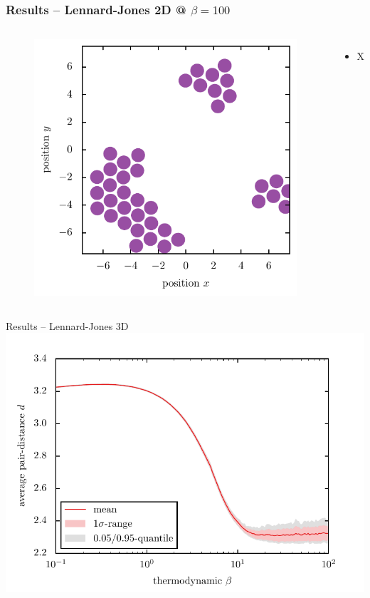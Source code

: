 \documentclass[mathserif,serif]{beamer}
\begin{document}
\begin{frame}
	\frametitle{Results -- Lennard-Jones 2D @ $\beta=100$}
	\centering
	\begin{columns}	
		\begin{figure}
			\includegraphics[width=\textwidth]{../report/figures/Beta_100_LJ.pdf}
		\end{figure}
		\begin{itemize}
			\item X
		\end{itemize}
	\end{columns}
\end{frame}

\begin{frame}{Results -- Lennard-Jones 3D}
	\pause
	\centering
	\includegraphics[width=\textwidth]{../report/figures/temp_dep_lennard_jones3d.pdf}
\end{frame}



\end{document}
